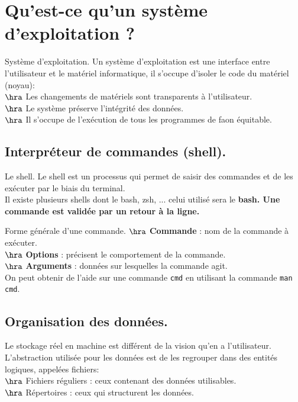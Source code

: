 \documentclass[french, 11pt]{article}
\begin{document}


\section{Qu'est-ce qu'un système d'exploitation ?}

\begin{defi}{Système d'exploitation.}{}
    Un système d'exploitation est une interface entre l'utilisateur et le matériel informatique, il s'occupe d'isoler le code du matériel (noyau):\\
    $\hra$ Les changements de matériels sont transparents à l'utilisateur.\\
    $\hra$ Le système préserve l'intégrité des données.\\
    $\hra$ Il s'occupe de l'exécution de tous les programmes de faon équitable.
\end{defi}

\subsection{Interpréteur de commandes (shell).}

\begin{defi}{Le shell.}{}
    Le shell est un processus qui permet de saisir des commandes et de les exécuter par le biais du terminal.\\
    Il existe plusieurs shells dont le bash, zsh, ... celui utilisé sera le \bf{bash}.\n
    Une commande est validée par un retour à la ligne.
\end{defi}

\begin{defi}{Forme générale d'une commande.}{}
    $\hra$ \textbf{Commande} : nom de la commande à exécuter.\\
    $\hra$ \textbf{Options} : précisent le comportement de la commande.\\
    $\hra$ \textbf{Arguments} : données sur lesquelles la commande agit.\\
    On peut obtenir de l'aide sur une commande \texttt{cmd} en utilisant la commande \texttt{man cmd}.
\end{defi}

\subsection{Organisation des données.}

\begin{defi}{}{}
    Le stockage réel en machine est différent de la vision qu'en a l'utilisateur.\n
    L'abstraction utilisée pour les données est de les regrouper dans des entités logiques, appelées fichiers:\\
    $\hra$ Fichiers réguliers : ceux contenant des données utilisables.\\
    $\hra$ Répertoires : ceux qui structurent les données.
\end{defi}
\end{document}

